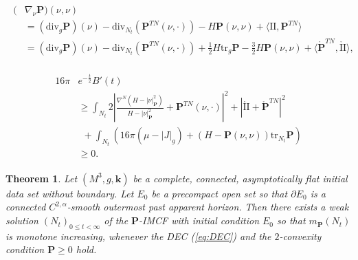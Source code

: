 \documentclass[10pt,a4paper]{amsart}
\newtheorem{thm}{Theorem}
\newcommand{\Pten}{\mathbf P}
\newcommand{\kten}{\mathbf k}
\begin{document}
\begin{align}\label{nabla-P-id}
	\begin{split}
		(&\nabla _{\nu } \Pten) (\nu ,\nu ) \\
		&= (\mathrm{div}_{g} \Pten) (\nu ) - \mathrm{div}_{N_t}(\Pten ^{TN}(\nu ,\cdot ) ) -H \mathbf{P}(\nu ,\nu ) + \langle \mathrm{II}, \mathbf{P}^{TN} \rangle \\
&= (\mathrm{div}_{g} \Pten) (\nu ) - \mathrm{div}_{N_t}(\Pten ^{TN}(\nu ,\cdot ) )
						   + \frac{1}{2} H\mathrm{tr}_g \Pten - \frac{3}{2}H \Pten(\nu ,\nu )   + \langle \mathring{\Pten} ^{TN}, \mathring{\mathrm{II}} \rangle,
	\end{split}
\end{align} 

\begin{align}\label{B'-ineq}
	\begin{split}
		16 \pi & e ^{-\frac{t}{2}}B'(t) \\
	&\geq  \int_{N_t} 2\left| \frac{\nabla ^{N} (H-|\nu |^2_{\Pten })}{H-|\nu |^2_{\Pten }} + \Pten ^{TN}(\nu , \cdot ) \right| ^2 + |\mathring{\mathrm{II}}+ \mathring{\Pten} ^{TN}|^2\\
	&\ \ + \int_{N_t}\left( 16 \pi (\mu -|J|_g)+ \left( H- \Pten(\nu ,\nu ) \right) \mathrm{tr}_{N_t} \Pten \right)   \\
	&\geq 0.
	\end{split}
\end{align} 

\begin{thm}\label{thm-weak-mono}
	Let $(M^3, g, \kten)$ be a complete, connected, asymptotically flat initial data set without boundary. Let $E_0$ be a precompact open set so that $\partial E_0$ is a connected $C ^{2, \alpha }$-smooth outermost past apparent horizon. Then there exists a weak solution $(N_t) _{0 \leq t< \infty}$ of the $\Pten$-IMCF with initial condition $E_0$ so that $m_{\Pten}(N_t)$ is monotone increasing, whenever the DEC (\ref{eq:DEC}) and the $2$-convexity condition $\mathbf{P} \geq 0$ hold.
\end{thm}
\end{document}
